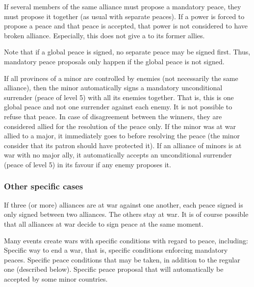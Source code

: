 \bparag If several members of the same alliance must propose a mandatory
peace, they must propose it together (as usual with separate peaces).
\bparag If a power is forced to propose a peace and that peace is accepted,
that power is not considered to have broken alliance.
\bparag Especially, this does not give a \CB to its former allies.

 Note that if a global peace is
signed, no separate peace may be signed first. Thus, mandatory peace proposals
only happen if the global peace is not signed.

\label{chPeace:Mandatory peace minors}
\bparag If all provinces of a minor are controlled by enemies (not necessarily
the same alliance), then the minor automatically signs a mandatory
unconditional surrender (peace of level 5) with all its enemies together. That
is, this is one global peace and not one surrender against each enemy.
\bparag It is not possible to refuse that peace. In case of disagreement
between the winners, they are considered allied for the resolution of the
peace only.
\bparag If the minor was at war allied to a major, it immediately goes to
\Neutral before resolving the peace (the minor consider that its patron should
have protected it).
\bparag If an alliance of minors is at war with no major ally, it
automatically accepts an unconditional surrender (peace of level 5) in its
favour if any enemy proposes it.

\subsubsection{Other specific cases}
\bparag If three (or more) alliances are at war against one another, each
peace signed is only signed between two alliances. The others stay at war.
\bparag It is of course possible that all alliances at war decide to sign
peace at the same moment.

 Many events create wars with specific conditions
with regard to peace, including:
\bparag Specific way to end a war, that is, specific conditions enforcing
mandatory peaces.
\bparag Specific peace conditions that may be taken, in addition to the
regular one (described below).
\bparag Specific peace proposal that will automatically be accepted by some
minor countries.

